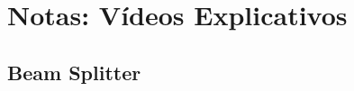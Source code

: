 \documentclass[12pt,a4paper]{report}
\begin{document}
%
%
























































\chapter{Notas: Vídeos Explicativos}

\section{Beam Splitter}\label{beam.splitter.section}
\end{document}
